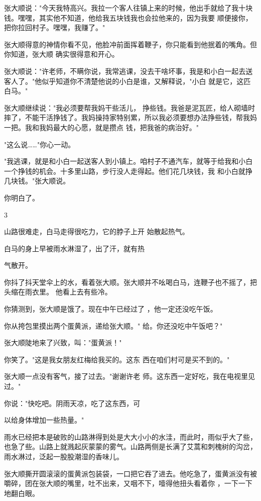 \documentclass{article}
\begin{document}
张大顺说："今天我特高兴。我拉一个客人往镇上来的时候，他出手就给了我十块钱。嘿嘿，其实他不知道，他给我五块钱我也会拉他来的，因为我要
顺便接你，把你拉回村子。嘿嘿，我赚了。" 

张大顺得意的神情你看不见，他脸冲前面挥着鞭子，你只能看到他抿着的嘴角。但你知道，张大顺
确实很得意和开心。 

张大顺说："许老师，不瞒你说，我常逃课，没去干啥坏事，我是和小白一起去送客人了。"他似乎知道你不清楚他说的小白是谁，又解释说，"小白
就是它，这匹白马。" 

张大顺继续说："我必须要帮我妈干些活儿，
\newpage
挣些钱。我爸是泥瓦匠，给人砌墙时摔了，不能干活挣钱了。我妈操持家特别累，所以我必须要想办法挣些钱，帮我妈一把。我和我妈最大的心愿，就是攒点
钱，把我爸的病治好。" 


"这么说……"你心一动。 

"我逃课，就是和小白一起送客人到小镇上。咱村子不通汽车，就等于给我和小白一个挣钱的机会。十多里山路，步行没人走得起。他们花几块钱，我
和小白就挣几块钱。"张大顺说。 


你明白了。 


3 

山路很难走，白马走得很吃力，它的脖子上开
始散起热气。 

白马的身上早被雨水淋湿了，出了汗，就有热

\newpage
气散开。 

你抖了抖天堂伞上的水，看着张大顺。张大顺并不吆喝白马，连鞭子也不摇了，把头缩在雨衣里。
他看上去有些冷。 

你猜测到，张大顺是饿了。现在中午已经过了
，他一定还没吃午饭。 

你从挎包里摸出两个蛋黄派，递给张大顺。"
给。你还没吃中午饭吧？" 


张大顺陡地来了兴致，叫："蛋黄派！" 

你笑了。"这是我女朋友红梅给我买的。这东
西在咱们村可是买不到的。" 

张大顺一点没有客气，接了过去。"谢谢许老
师。这东西一定好吃，我在电视里见过。" 

你说："快吃吧。阴雨天凉，吃了这东西，可

\newpage
以给身体增加一些热量。" 

雨水已经把本是破败的山路淋得到处是大大小小的水洼，而此时，雨似乎大了些，也急了些。山路上就溅起灰蒙蒙的雾气。山路两侧是长满了艾蒿和刺槐树的沟岔，雨水淋过，泛起一股股潮湿的香味儿。
 

张大顺撕开圆滚滚的蛋黄派包装袋，一口把它吞了进去。他吃急了，蛋黄派没有被嚼碎，团在张大顺的嘴里，吐不出来，又咽不下，噎得他扭头看着你
，一下一下地翻白眼。 
\end{document}
